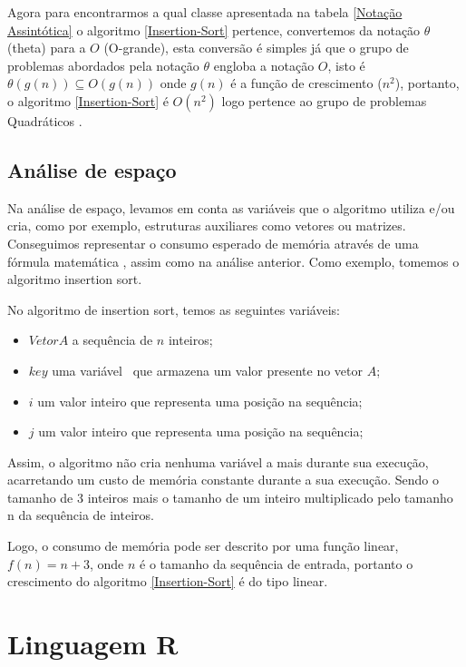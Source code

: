 \documentclass[
    12pt,               %
    openright,          %
    oneside,            %
    a4paper,            %
    english,            %
    brazil              %
    ]{abntex2}
\begin{document}
Agora para encontrarmos a qual classe apresentada na tabela \ref{Notação Assintótica} o algoritmo \ref{Insertion-Sort} pertence, convertemos
da notação $\theta$ (theta) para a $O$ (O-grande), esta conversão é simples já que o grupo de problemas abordados pela notação $\theta$ engloba
a notação $O$, isto é $\theta(g(n)) \subseteq O(g(n))$ onde $g(n)$ é a função de crescimento ($n^2$), portanto, o algoritmo \ref{Insertion-Sort}
é $O(n^2)$ logo pertence ao grupo de problemas Quadráticos \cite{introductionAlgorthms}.

\subsection{Análise de espaço}

Na análise de espaço, levamos em conta as variáveis que o algoritmo utiliza e/ou cria, como por exemplo, estruturas auxiliares como vetores ou 
matrizes. Conseguimos representar o consumo esperado de memória através de uma fórmula matemática \cite{introductionAnalysis}, assim como na 
análise anterior. Como exemplo, tomemos o algoritmo insertion sort.

No algoritmo de insertion sort, temos as seguintes variáveis:

\begin{itemize}
    \item $Vetor A$ a sequência de $n$ inteiros;
    \item $key$ uma variável  que armazena um valor presente no vetor $A$;
    \item $i$ um valor inteiro que representa uma posição na sequência;
    \item $j$ um valor inteiro que representa uma posição na sequência;
\end{itemize}

Assim, o algoritmo não cria nenhuma variável a mais durante sua execução, acarretando um custo de memória constante durante a sua execução. 
Sendo o tamanho de 3 inteiros mais o tamanho de um inteiro multiplicado pelo tamanho n da sequência de inteiros.

Logo, o consumo de memória pode ser descrito por uma função linear, $f(n) = n + 3$, onde $n$ é o tamanho da sequência de entrada, portanto 
o crescimento do algoritmo \ref{Insertion-Sort} é do tipo linear.

\section{Linguagem R}
\end{document}
